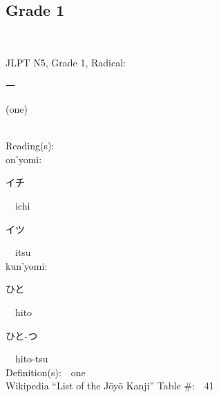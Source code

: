 
\subsection*{Grade 1 }
  \label{P1-1}
\begin{multicols}{2} 
{\fontsize{34pt}{40pt}  }\ \ \\  %
{JLPT N5, Grade 1, Radical:\ \ {\begin{CJK}{UTF8}{min} 一 \end{CJK}} (one) } \\
Reading(s):\ \ \\
{\hspace*{1em}}on'yomi:\ \ \\
{\hspace*{2em}}{\begin{CJK}{UTF8}{min} イチ \end{CJK}}\ \ ichi\ \ \\
{\hspace*{2em}}{\begin{CJK}{UTF8}{min} イツ \end{CJK}}\ \ itsu\ \ \\
{\hspace*{1em}}kun'yomi:\ \ \\
{\hspace*{2em}}{\begin{CJK}{UTF8}{min} ひと \end{CJK}}\ \ hito\ \ \\
{\hspace*{2em}}{\begin{CJK}{UTF8}{min} ひと-つ \end{CJK}}\ \ hito-tsu\ \ \\
Definition(s):\ \ one \\
Wikipedia ``List of the J\=oy\=o Kanji'' Table \#:\ \ 41 \\
\ \ \\
{\fontsize{34pt}{40pt}  }\ \ \\  %

\end{multicols}
